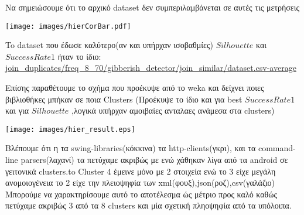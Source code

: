 Να σημειώσουμε ότι το αρχικό dataset δεν συμπεριλαμβάνεται σε αυτές τις μετρήσεις

\noindent\begin{minipage}{\linewidth}
    \centering
    \texttt{[image: images/hierCorBar.pdf]}
    \label{fig:CorrelationHier}
\end{minipage}

To dataset που έδωσε καλύτερο(αν και υπήρχαν ισοβαθμίες) $Silhouette$ και $Success Rate 1$ ήταν το ίδιο: \\ \url{join_duplicates/freq_8_70/gibberish_detector/join_similar/dataset.csv-average}\\

\begin{minipage}{\linewidth}
    \centering
    \label{my-label}
\end{minipage}

Επίσης παραθέτουμε το σχήμα που προέκυψε από το weka και δείχνει ποιες
βιβλιοθήκες μπήκαν σε ποια Clusters (Προέκυψε το ίδιο και για best $Success Rate 1$ και για $Silhouette$ ,λογικά υπήρχαν αμοιβαίες ανταλαες ανάμεσα στα clusters)

\noindent\begin{minipage}{\linewidth}
    \centering
    \texttt{[image: images/hier\_result.eps]}
    \label{fig:clustering}
\end{minipage}

Βλέπουμε ότι η τα swing-libraries(κόκκινα) τα http-clients(γκρι), 
και τα command-line parsers(λαχανί) τα πετύχαμε ακριβώς με ενώ χάθηκαν 
λίγα από τα android σε γειτονικά clusters.to Cluster 4 έμεινε μόνο με 2 στοιχεία ενώ το 3 είχε μεγάλη ανομοιογένεια το 2 είχε την πλειοψηφία των xml(φουξ),json(ροζ),csv(γαλάζιο)
Μπορούμε να χαρακτηρίσουμε αυτό το αποτέλεσμα ώς μέτριο προς καλό
καθώς πετύχαμε ακριβώς 3 από τα 8 clusters και μία σχετική πληοψηφία από τα υπόλοιπα.



